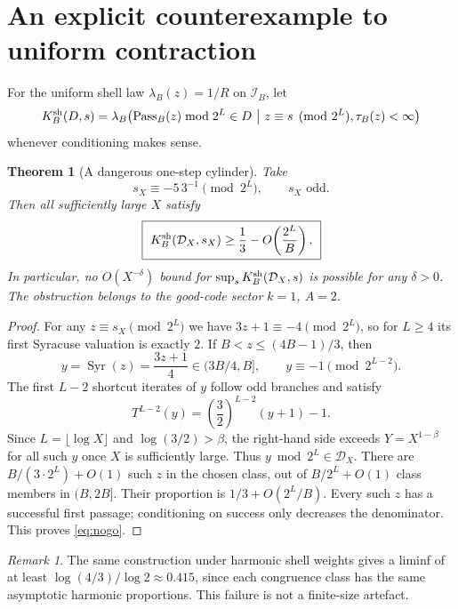 \documentclass[10pt]{amsart}
\newtheorem{theorem}{Theorem}
\theoremstyle{definition}\newtheorem{definition}{Definition}
\theoremstyle{remark}\newtheorem{remark}{Remark}
\newcommand{\Syr}{\operatorname{Syr}}
\newcommand{\Pass}{\operatorname{Pass}}
\newcommand{\cI}{\mathcal I}
\newcommand{\cD}{\mathcal D}
\begin{document}
\section{An explicit counterexample to uniform contraction}
For the uniform shell law $\lambda_B(z)=1/R$ on $\cI_B$, let
\[
 K_B^{\rm sh}(D,s)=\lambda_B\!\left(\Pass_B(z)\bmod2^L\in D\ \middle|\ z\equiv s\pmod{2^L},\tau_B(z)<\infty\right)
\]
whenever conditioning makes sense.

\begin{theorem}[A dangerous one-step cylinder]\label{thm:nogo}
Take
\begin{equation}\label{eq:s}
 s_X\equiv -5\,3^{-1}\pmod{2^L},\qquad s_X\text{ odd}.
\end{equation}
Then all sufficiently large $X$ satisfy
\begin{equation}\label{eq:nogo}
 \boxed{\ K_B^{\rm sh}(\cD_X,s_X)\ge \frac13-O\!\left(\frac{2^L}{B}\right).\ }
\end{equation}
In particular, no $O(X^{-\delta})$ bound for $\sup_sK_B^{\rm sh}(\cD_X,s)$ is possible for any $\delta>0$. The obstruction belongs to the \emph{good}-code sector $k=1$, $A=2$.
\end{theorem}
\begin{proof}
For any $z\equiv s_X\pmod{2^L}$ we have
$3z+1\equiv-4\pmod{2^L}$, so for $L\ge4$ its first Syracuse valuation is exactly $2$. If $B<z\le(4B-1)/3$, then
\[
 y=\Syr(z)=\frac{3z+1}{4}\in(3B/4,B],\qquad
 y\equiv-1\pmod{2^{L-2}}.
\]
The first $L-2$ shortcut iterates of $y$ follow odd branches and satisfy
\[
 T^{L-2}(y)=\left(\frac32\right)^{L-2}(y+1)-1.
\]
Since $L=\lfloor\log X\rfloor$ and $\log(3/2)>\beta$, the right-hand side exceeds $Y=X^{1-\beta}$ for all such $y$ once $X$ is sufficiently large. Thus $y\bmod2^L\in\cD_X$. There are $B/(3\cdot2^L)+O(1)$ such $z$ in the chosen class, out of $B/2^L+O(1)$ class members in $(B,2B]$. Their proportion is $1/3+O(2^L/B)$. Every such $z$ has a successful first passage; conditioning on success only decreases the denominator. This proves \eqref{eq:nogo}.
\end{proof}
\begin{remark}
The same construction under harmonic shell weights gives a liminf of at least $\log(4/3)/\log2\approx0.415$, since each congruence class has the same asymptotic harmonic proportions. This failure is not a finite-size artefact.
\end{remark}
\end{document}
